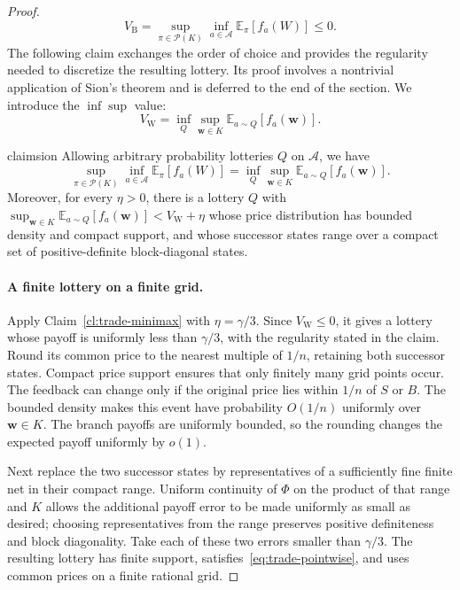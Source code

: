 \documentclass[11pt]{article}
\newcommand{\Esub}[2]{\mathbb E_{#1}\left[#2\right]}
\begin{document}
\begin{proof}
\[
 V_{\mathrm B} = \sup_{\pi\in\mathcal P(K)}\inf_{a\in\mathcal A}\Esub{\pi}{f_a(W)}\le0.
\]
The following claim exchanges the order of choice and provides the regularity needed to discretize the resulting lottery. Its proof involves a {nontrivial} application of {Sion's theorem and is deferred to} the end of the section. We introduce the $\inf \sup$ {value}:
\[
    V_{\mathrm W} = \inf_Q\sup_{\boldsymbol w\in K}\Esub{a\sim Q}{f_a(\boldsymbol w)}.
\]
\begin{restatable}{claim}{sion}\label{cl:trade-minimax}
Allowing arbitrary probability lotteries $Q$ on $\mathcal A$, we have
\[
 \sup_{\pi\in\mathcal P(K)}\inf_{a\in\mathcal A}\Esub{\pi}{f_a(W)}=\inf_Q\sup_{\boldsymbol w\in K}\Esub{a\sim Q}{f_a(\boldsymbol w)}.
\]
Moreover, for every $\eta>0$, there is a lottery $Q$ with $\sup_{\boldsymbol w\in K}\Esub{a\sim Q}{f_a(\boldsymbol w)}<V_{\mathrm{W}}+\eta$ whose price distribution has bounded density and compact support, and whose successor states range over a compact set of positive-definite block-diagonal states.
\end{restatable}

\paragraph{A finite lottery on a finite grid.}
Apply Claim~\ref{cl:trade-minimax} with $\eta=\gamma/3$. Since $V_{\mathrm W}\le0$, it gives a lottery whose payoff is uniformly less than $\gamma/3$, with the regularity stated in the claim. Round its common price to the nearest multiple of $1/n$, retaining both successor states. Compact price support ensures that only finitely many grid points occur. The feedback can change only if the original price lies within $1/n$ of $S$ or $B$. The bounded density makes this event have probability $O(1/n)$ uniformly over $\boldsymbol w\in K$. The branch payoffs are uniformly bounded, so the rounding changes the expected payoff uniformly by $o(1)$.

Next replace the two successor states by representatives of a sufficiently fine finite net in their compact range. Uniform continuity of $\Phi$ {on the product of that range and $K$ allows the additional payoff error to be made uniformly as small as desired}; choosing representatives from the range preserves positive definiteness and block diagonality. Take each of these two errors smaller than $\gamma/3$. The resulting lottery has finite support, satisfies~\eqref{eq:trade-pointwise}, and uses common prices on a finite rational grid.
\end{proof}
\end{document}
